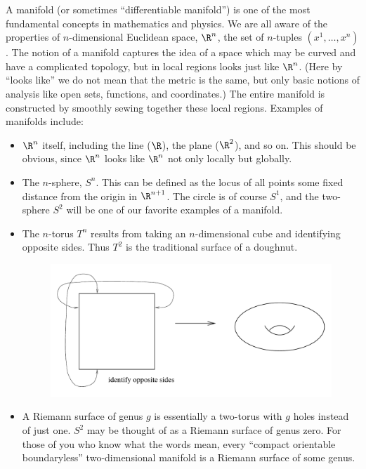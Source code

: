 \documentclass[12pt]{article}
\begin{document}
A manifold (or sometimes ``differentiable manifold'') is one of the
most fundamental concepts in mathematics and physics.  We are all
aware of the properties of $n$-dimensional Euclidean space, $\R^n$,
the set of $n$-tuples $(x^1,\ldots,x^n)$.
The notion of a manifold captures the idea of a space which may be
curved and have a complicated topology, but in local regions looks
just like $\R^n$.  (Here by ``looks like'' we do not mean that the
metric is the same, but only basic notions of analysis like open sets,
functions, and coordinates.)  The entire manifold is constructed by
smoothly sewing together these local regions.  Examples of manifolds
include:
\begin{itemize}
  \item $\R^n$ itself, including the line ($\R$), the plane
  ($\R^2$), and so on.  This should be obvious, since $\R^n$ looks 
  like $\R^n$ not only locally but globally.
  \item The $n$-sphere, $S^n$.  This can be defined as the locus
  of all points some fixed distance from the origin in $\R^{n+1}$.
  The circle is of course $S^1$, and the two-sphere $S^2$ will be one
  of our favorite examples of a manifold.


  \item The $n$-torus $T^n$ results from taking an 
  $n$-dimensional cube and identifying opposite sides.  Thus $T^2$ is
  the traditional surface of a doughnut.

\begin{figure}[h]
  \centerline{
  \includegraphics[height=5cm]{pdf/two1}}
\end{figure}

  \item A Riemann surface of genus $g$ is essentially a
  two-torus with $g$ holes instead of just one.  $S^2$ may be thought
  of as a Riemann surface of genus zero.  For those of you who know 
  what the words mean, every ``compact orientable boundaryless''
  two-dimensional manifold is a Riemann surface of some genus.


\end{itemize}
\end{document}
